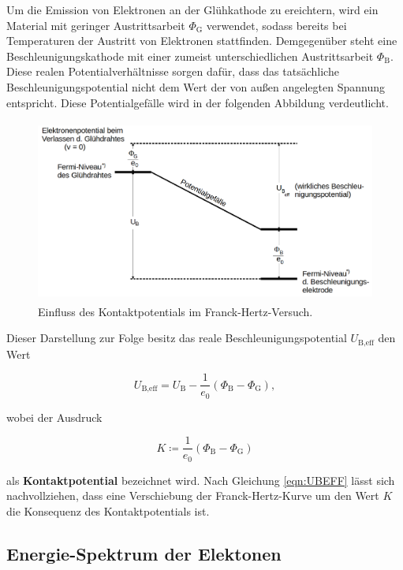 Um die Emission von Elektronen an der Glühkathode zu ereichtern, wird ein Material mit geringer Austrittsarbeit $\Phi_\text{G}$ verwendet, sodass bereits bei 
Temperaturen der Austritt von Elektronen stattfinden. Demgegenüber steht eine Beschleunigungskathode mit einer zumeist unterschiedlichen Austrittsarbeit $\Phi_\text{B}$.
Diese realen Potentialverhältnisse sorgen dafür, dass das tatsächliche Beschleunigungspotential nicht dem Wert der von außen angelegten Spannung entspricht. 
Diese Potentialgefälle wird in der folgenden Abbildung verdeutlicht.

\begin{figure}
    \centering
    \includegraphics[height=6cm]{Kontaktpotential.png}
    \caption{Einfluss des Kontaktpotentials im Franck-Hertz-Versuch\cite{Versuchsanleitung_v601}.}
    \label{fig:Kontaktpotential}
\end{figure}

\noindent Dieser Darstellung zur Folge besitz das reale Beschleunigungspotential $U_\text{B,eff}$ den Wert

\begin{equation}
    U_\text{B,eff} = U_\text{B} - \frac{1}{e_0}\left(\Phi_\text{B} - \Phi_\text{G}\right),
\label{eqn:UBEFF}
\end{equation}

\noindent wobei der Ausdruck 

\begin{equation*}
    K \coloneqq \frac{1}{e_0}\left(\Phi_\text{B} - \Phi_\text{G}\right)
\end{equation*}

\noindent als \textbf{Kontaktpotential} bezeichnet wird. Nach Gleichung \eqref{eqn:UBEFF} lässt sich nachvollziehen, dass eine Verschiebung der Franck-Hertz-Kurve 
um den Wert $K$ die Konsequenz des Kontaktpotentials ist. 

\subsection*{Energie-Spektrum der Elektonen}

